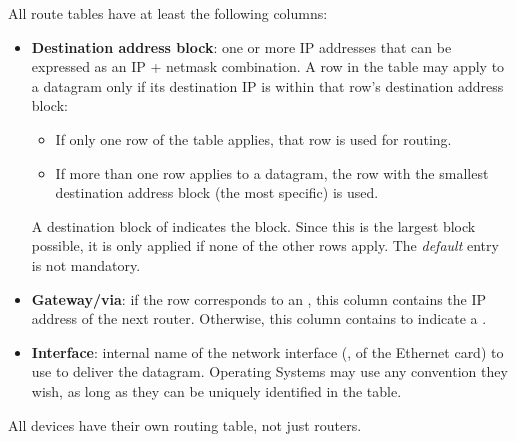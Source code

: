 All route tables have at least the following columns:
\begin{itemize}
\item \textbf{Destination address block}: one or more IP addresses that can be expressed as an IP + netmask combination.
  A row in the table may apply to a datagram only if its destination IP is within that row's destination address block:
  \begin{itemize}
  \item If only one row of the table applies, that row is used for routing.
  \item If more than one row applies to a datagram, the row with the smallest destination address block 
    (the most specific) is used.
  \end{itemize}
  A destination block of  indicates the  block.
  Since this is the largest block possible, it is only applied if none of the other rows apply. 
  The \textit{default} entry is not mandatory.\\[-0.3cm]
  
\item \textbf{Gateway/via}: if the row corresponds to an , this column contains the IP address
  of the next router. Otherwise, this column contains  to indicate a .\\[-0.3cm]
  
\item \textbf{Interface}: internal name of the network interface (\eg, of the Ethernet card) to use to deliver the 
  datagram. Operating Systems may use any convention they wish, as long as they can be uniquely identified in the table.
\end{itemize}

\begin{remark}
All devices have their own routing table, not just routers.
\end{remark}

